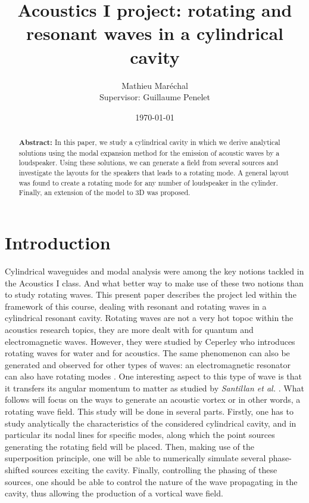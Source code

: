 \documentclass[%
 reprint,
 amsmath,amssymb,
 aps,
]{revtex4-2}
\begin{document}
\title{Acoustics I project: rotating and resonant waves in a cylindrical cavity}
\author{Mathieu Maréchal\\ Supervisor: Guillaume Penelet}
%
\date{\today}

\begin{abstract}
    \textbf{Abstract:} In this paper, we study a cylindrical cavity in which we derive analytical solutions using the modal expansion method for the emission of acoustic waves by a loudspeaker. Using these solutions, we can generate a field from several sources and investigate the layouts for the speakers that leads to a rotating mode. A general layout was found to create a rotating mode for any number of loudspeaker in the cylinder. Finally, an extension of the model to 3D was proposed.
\end{abstract}

\maketitle
\section{Introduction}
Cylindrical waveguides and modal analysis were among the key notions tackled in the Acoustics I class. And what better way to make use of these two notions than to study rotating waves. This present paper describes the project led within the framework of this course, dealing with resonant and rotating waves in a cylindrical resonant cavity. Rotating waves are not a very hot topoc within the acoustics research topics, they are more dealt with for quantum and electromagnetic waves. However, they were studied by Ceperley \cite{ceperley2002} who introduces rotating waves for water and for acoustics. The same phenomenon can also be generated and observed for other types of waves: an electromagnetic resonator can also have rotating modes \cite{ceperley1995}. One interesting aspect to this type of wave is that it transfers its angular momentum to matter as studied by \emph{Santillan et al.} \cite{santillan2009}. What follows will focus on the ways to generate an acoustic vortex or in other words, a rotating wave field. This study will be done in several parts. Firstly, one has to study analytically the characteristics of the considered cylindrical cavity, and in particular its nodal lines for specific modes, along which the point sources generating the rotating field will be placed. Then, making use of the superposition principle, one will be able to numerically simulate several phase-shifted sources exciting the cavity. Finally, controlling the phasing of these sources, one should be able to control the nature of the wave propagating in the cavity, thus allowing the production of a vortical wave field. 
\end{document}
